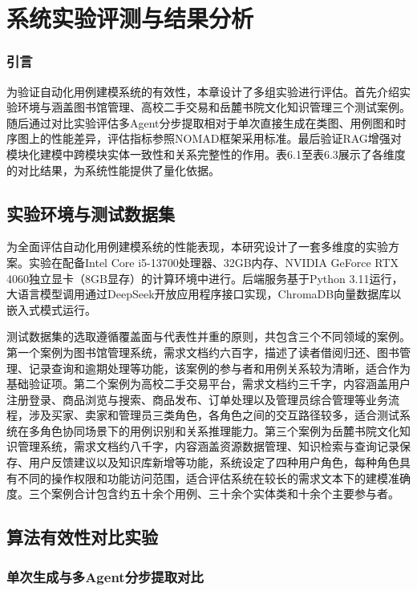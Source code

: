 \chapter{系统实验评测与结果分析}
\vspace{7pt}

\subsection*{引言}
为验证自动化用例建模系统的有效性，本章设计了多组实验进行评估。首先介绍实验环境与涵盖图书馆管理、高校二手交易和岳麓书院文化知识管理三个测试案例。随后通过对比实验评估多Agent分步提取相对于单次直接生成在类图、用例图和时序图上的性能差异，评估指标参照NOMAD框架采用标准。最后验证RAG增强对模块化建模中跨模块实体一致性和关系完整性的作用。表6.1至表6.3展示了各维度的对比结果，为系统性能提供了量化依据。

\section{实验环境与测试数据集}

为全面评估自动化用例建模系统的性能表现，本研究设计了一套多维度的实验方案。实验在配备Intel Core i5-13700处理器、32GB内存、NVIDIA GeForce RTX 4060独立显卡（8GB显存）的计算环境中进行。后端服务基于Python 3.11运行，大语言模型调用通过DeepSeek开放应用程序接口实现，ChromaDB向量数据库以嵌入式模式运行。

测试数据集的选取遵循覆盖面与代表性并重的原则，共包含三个不同领域的案例。第一个案例为图书馆管理系统，需求文档约六百字，描述了读者借阅归还、图书管理、记录查询和逾期处理等功能，该案例的参与者和用例关系较为清晰，适合作为基础验证项。第二个案例为高校二手交易平台，需求文档约三千字，内容涵盖用户注册登录、商品浏览与搜索、商品发布、订单处理以及管理员综合管理等业务流程，涉及买家、卖家和管理员三类角色，各角色之间的交互路径较多，适合测试系统在多角色协同场景下的用例识别和关系推理能力。第三个案例为岳麓书院文化知识管理系统，需求文档约八千字，内容涵盖资源数据管理、知识检索与查询记录保存、用户反馈建议以及知识库新增等功能，系统设定了四种用户角色，每种角色具有不同的操作权限和功能访问范围，适合评估系统在较长的需求文本下的建模准确度。三个案例合计包含约五十余个用例、三十余个实体类和十余个主要参与者。

\section{算法有效性对比实验}

\subsection{单次生成与多Agent分步提取对比}

